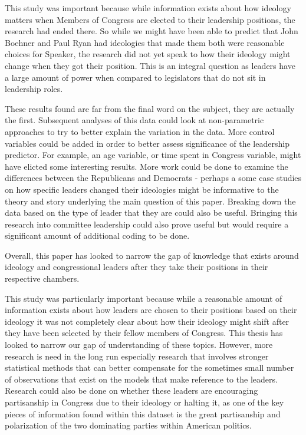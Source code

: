 \documentclass[12pt,twoside]{reedthesis}
\begin{document}
  This study was important because while information exists about how
  ideology matters when Members of Congress are elected to their
  leadership positions, the research had ended there. So while we might
  have been able to predict that John Boehner and Paul Ryan had ideologies
  that made them both were reasonable choices for Speaker, the research
  did not yet speak to how their ideology might change when they got their
  position. This is an integral question as leaders have a large amount of
  power when compared to legislators that do not sit in leadership roles.
  
  These results found are far from the final word on the subject, they are
  actually the first. Subsequent analyses of this data could look at
  non-parametric approaches to try to better explain the variation in the
  data. More control variables could be added in order to better assess
  significance of the leadership predictor. For example, an age variable,
  or time spent in Congress variable, might have elicted some interesting
  results. More work could be done to examine the differences between the
  Republicans and Democrats - perhaps a some case studies on how specific
  leaders changed their ideologies might be informative to the theory and
  story underlying the main question of this paper. Breaking down the data
  based on the type of leader that they are could also be useful. Bringing
  this research into committee leadership could also prove useful but
  would require a significant amount of additional coding to be done.
  
  Overall, this paper has looked to narrow the gap of knowledge that
  exists around ideology and congressional leaders after they take their
  positions in their respective chambers.
  
  This study was particularly important because while a reasonable amount
  of information exists about how leaders are chosen to their positions
  based on their ideology it was not completely clear about how their
  ideology might shift after they have been selected by their fellow
  members of Congress. This thesis has looked to narrow our gap of
  understanding of these topics. However, more research is need in the
  long run especially research that involves stronger statistical methods
  that can better compensate for the sometimes small number of
  observations that exist on the models that make reference to the
  leaders. Research could also be done on whether these leaders are
  encouraging partisanship in Congress due to their ideology or halting
  it, as one of the key pieces of information found within this dataset is
  the great partisanship and polarization of the two dominating parties
  within American politics.
  
\end{document}
